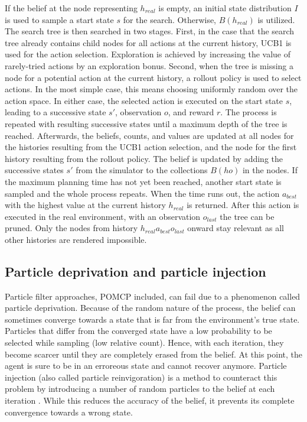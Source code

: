 If the belief at the node representing $h_{real}$ is empty, an initial state distribution $I$ is used to sample a start state $s$ for the search. Otherwise, $B(h_{real})$ is utilized. The search tree is then searched in two stages. First, in the case that the search tree already contains child nodes for all actions at the current history, UCB1 is used for the action selection. Exploration is achieved by increasing the value of rarely-tried actions by an exploration bonus. Second, when the tree is missing a node for a potential action at the current history, a rollout policy is used to select actions. In the most simple case, this means choosing uniformly random over the action space. In either case, the selected action is executed on the start state $s$, leading to a successive state $s'$, observation $o$, and reward $r$. The process is repeated with resulting successive states until a maximum depth of the tree is reached. Afterwards, the beliefs, counts, and values are updated at all nodes for the histories resulting from the UCB1 action selection, and the node for the first history resulting from the rollout policy. The belief is updated by adding the successive states $s'$ from the simulator to the collections $B(ho)$ in the nodes. If the maximum planning time has not yet been reached, another start state is sampled and the whole process repeats. When the time runs out, the action $a_{best}$ with the highest value at the current history $h_{real}$ is returned. After this action is executed in the real environment, with an observation $o_{last}$ the tree can be pruned. Only the nodes from history $h_{real}a_{best}o_{last}$ onward stay relevant as all other histories are rendered impossible.



\subsection{Particle deprivation and particle injection}
\label{sec:particle_deprivation}

Particle filter approaches, POMCP included, can fail due to a phenomenon called particle deprivation. Because of the random nature of the process, the belief can sometimes converge towards a state that is far from the environment's true state. Particles that differ from the converged state have a low probability to be selected while sampling (low relative count). Hence, with each iteration, they become scarcer until they are completely erased from the belief. At this point, the agent is sure to be in an erroreous state and cannot recover anymore. Particle injection (also called particle reinvigoration) is a method to counteract this problem by introducing a number of random particles to the belief at each iteration \parencite{decision_making_book}. While this reduces the accuracy of the belief, it prevents its complete convergence towards a wrong state. 

